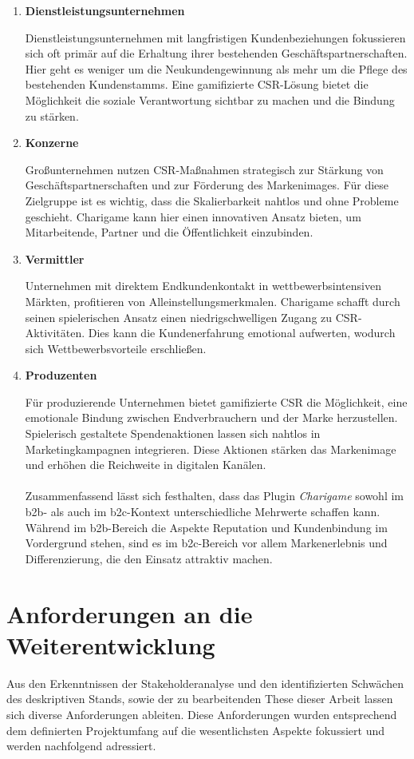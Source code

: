 \begin{enumerate}
    \item \textbf{Dienstleistungsunternehmen}

Dienstleistungsunternehmen mit langfristigen Kundenbeziehungen fokussieren sich oft primär auf die Erhaltung ihrer bestehenden Geschäftspartnerschaften.
Hier geht es weniger um die Neukundengewinnung als mehr um die Pflege des bestehenden Kundenstamms.
Eine gamifizierte CSR-Lösung bietet die Möglichkeit die soziale Verantwortung sichtbar zu machen und die Bindung zu stärken.

    \item \textbf{Konzerne}

Großunternehmen nutzen CSR-Maßnahmen strategisch zur Stärkung von Geschäftspartnerschaften und zur Förderung des Markenimages.
Für diese Zielgruppe ist es wichtig, dass die Skalierbarkeit nahtlos und ohne Probleme geschieht.
Charigame kann hier einen innovativen Ansatz bieten, um Mitarbeitende, Partner und die Öffentlichkeit einzubinden.

    \item \textbf{Vermittler}

Unternehmen mit direktem Endkundenkontakt in wettbewerbsintensiven Märkten, profitieren von Alleinstellungsmerkmalen.
Charigame schafft durch seinen spielerischen Ansatz einen niedrigschwelligen Zugang zu CSR-Aktivitäten.
Dies kann die Kundenerfahrung emotional aufwerten, wodurch sich Wettbewerbsvorteile erschließen.

    \item \textbf{Produzenten}

Für produzierende Unternehmen bietet gamifizierte CSR die Möglichkeit, eine emotionale Bindung zwischen Endverbrauchern und der Marke herzustellen.\cite{zhang2025csr}
Spielerisch gestaltete Spendenaktionen lassen sich nahtlos in Marketingkampagnen integrieren.
Diese Aktionen stärken das Markenimage und erhöhen die Reichweite in digitalen Kanälen.\\\\
Zusammenfassend lässt sich festhalten, dass das Plugin \textit{Charigame} sowohl im \gls{b2b}- als auch im \gls{b2c}-Kontext unterschiedliche Mehrwerte schaffen kann.
Während im \gls{b2b}-Bereich die Aspekte Reputation und Kundenbindung im Vordergrund stehen, sind es im \gls{b2c}-Bereich vor allem Markenerlebnis und Differenzierung, die den Einsatz attraktiv machen.
\end{enumerate}

\section{Anforderungen an die Weiterentwicklung}
Aus den Erkenntnissen der Stakeholderanalyse und den identifizierten Schwächen des deskriptiven Stands, sowie der zu bearbeitenden These dieser Arbeit lassen sich diverse Anforderungen ableiten.
Diese Anforderungen wurden entsprechend dem definierten Projektumfang auf die wesentlichsten Aspekte fokussiert und werden nachfolgend adressiert.

